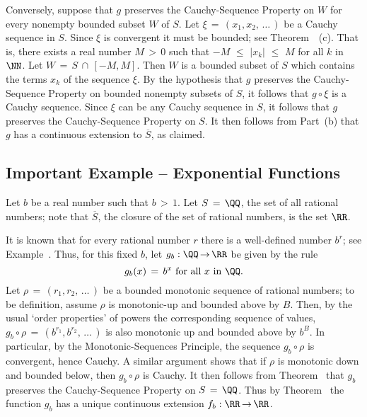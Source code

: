         Conversely, suppose that $g$ preserves the Cauchy-Sequence Property on $W$ for every nonempty bounded subset $W$ of $S$.
    Let ${\xi} \,=\, (x_{1},x_{2},\,{\ldots}\,)$ be a Cauchy sequence in $S$.
    Since ${\xi}$ is convergent it must be bounded; see Theorem~~(c).
    That is, there exists a real number $M\,>\,0$ such that $-M\,\,{\leq}\,\,|x_{k}|\,\,{\leq}\,\,M$ for all $k$ in ${\NN}$.
    Let $W \,=\, S\,{\cap}\,[-M,M]$. Then $W$ is a bounded subset of $S$ which contains the terms $x_{k}$ of the sequence ${\xi}$.
    By the hypothesis that $g$ preserves the Cauchy-Sequence Property on bounded nonempty subsets of $S$, it follows that $g{\circ}{\xi}$ is a Cauchy sequence.
    Since ${\xi}$ can be any Cauchy sequence in $S$, it follows that $g$ preserves the Cauchy-Sequence Property on $S$.
    It then follows from Part~(b) that $g$ has a continuous extension to $\overline{S}$, as claimed.

\V
\V


            \subsection{\small{\bf Important Example -- Exponential Functions}}
            \label{ExampF20.100}

\V

        Let $b$ be a real number such that $b\,>\,1$. Let $S \,=\, {\QQ}$, the set of all rational numbers; note that $\overline{S}$, the closure of the set of rational numbers, is the set ${\RR}$.

        It is known that for every rational number $r$ there is a well-defined number $b^{r}$; see Example~.
    Thus, for this fixed $b$, let $g_{b}:{\QQ} \,{\rightarrow}\, {\RR}$ be given by the rule
        \begin{displaymath}
        g_{b}(x) \,=\, b^{x} \mbox{ for all $x$ in ${\QQ}$}.
        \end{displaymath}
    Let ${\rho} \,=\, (r_{1},r_{2},\,{\ldots}\,)$ be a bounded monotonic sequence of rational numbers; to be definition, assume ${\rho}$ is monotonic-up and bounded above by $B$.
    Then, by the usual `order properties' of powers the corresponding sequence of values, $g_{b}{\circ}{\rho} \,=\, (b^{r_{1}},b^{r_{2}},\,{\ldots}\,)$ is also monotonic up and bounded above by $b^{B}$.
    In particular, by the Monotonic-Sequences Principle, the sequence $g_{b}{\circ}{\rho}$ is convergent, hence Cauchy.
    A similar argument shows that if ${\rho}$ is monotonic down and bounded below, then $g_{b}{\circ}{\rho}$ is Cauchy.
    It then follows from Theorem~ that $g_{b}$ preserves the Cauchy-Sequence Property on $S \,=\, {\QQ}$.
    Thus by Theorem~ the function $g_{b}$ has a unique continuous extension $f_{b}:{\RR} \,{\rightarrow}\, {\RR}$.

